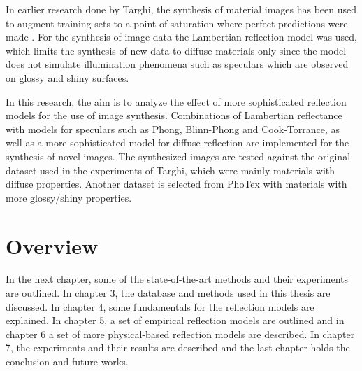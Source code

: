 In earlier research done by Targhi, the synthesis of material images has been used to augment training-sets to a point of saturation where perfect predictions were made \cite{Targhi}. For the synthesis of image data the Lambertian reflection model was used, which limits the synthesis of new data to diffuse materials only since the model does not simulate illumination phenomena such as speculars which are observed on glossy and shiny surfaces.

In this research, the aim is to analyze the effect of more sophisticated reflection models for the use of image synthesis. Combinations of Lambertian reflectance with models for speculars such as Phong, Blinn-Phong and Cook-Torrance, as well as a more sophisticated model for diffuse reflection are implemented for the synthesis of novel images. The synthesized images are tested against the original dataset used in the experiments of Targhi, which were mainly materials with diffuse properties. Another dataset is selected from PhoTex with materials with more glossy/shiny properties.

\section{Overview}
In the next chapter, some of the state-of-the-art methods and their experiments are outlined. In chapter 3, the database and methods used in this thesis are discussed. In chapter 4, some fundamentals for the reflection models are explained. In chapter 5, a set of empirical reflection models are outlined and in chapter 6 a set of more physical-based reflection models are described. In chapter 7, the experiments and their results are described and the last chapter holds the conclusion and future works.

